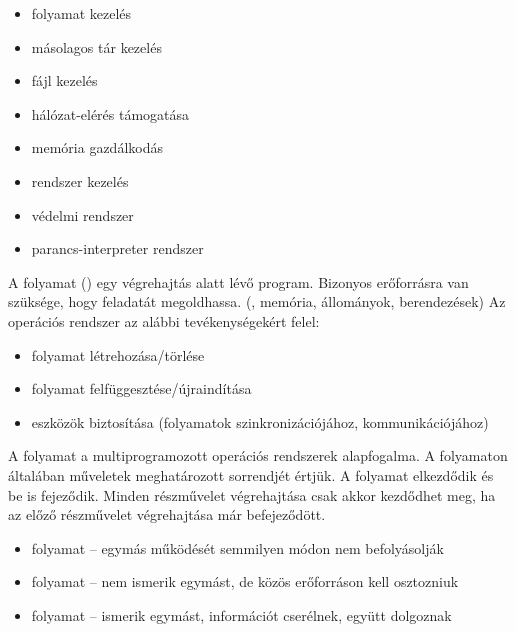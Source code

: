 \documentclass[main.tex]{subfiles}
\begin{document}
  \begin{minipage}[t]{0.5\textwidth}
    \begin{itemize}
      \item folyamat kezelés
      \item másolagos tár kezelés
      \item fájl kezelés
      \item hálózat-elérés támogatása
    \end{itemize}
  \end{minipage}\hfill
  \begin{minipage}[t]{0.5\textwidth}
    \begin{itemize}
      \item memória gazdálkodás
      \item {} rendszer kezelés
      \item védelmi rendszer
      \item parancs-interpreter rendszer
    \end{itemize}
  \end{minipage}\hfill
  


  A folyamat () egy végrehajtás alatt lévő program.
  Bizonyos erőforrásra van szüksége, hogy feladatát megoldhassa.
  (, memória, állományok,  berendezések)
  Az operációs rendszer az alábbi tevékenységekért felel:
  \begin{itemize}
    \item folyamat létrehozása/törlése
    \item folyamat felfüggesztése/újraindítása
    \item eszközök biztosítása
    (folyamatok szinkronizációjához, kommunikációjához)
  \end{itemize}
  A folyamat a multiprogramozott operációs rendszerek alapfogalma.
  A folyamaton általában műveletek meghatározott sorrendjét értjük.
  A folyamat elkezdődik és be is fejeződik.
  Minden részművelet végrehajtása csak akkor kezdődhet meg,
  ha az előző részművelet végrehajtása már befejeződött.
  \begin{itemize}
    \item {} folyamat
    \tabto{4.6cm} – \tabto{5.2cm}
    egymás működését semmilyen módon nem befolyásolják

    \item {} folyamat
    \tabto{4.6cm} – \tabto{5.2cm}
    nem ismerik egymást, de közös erőforráson kell osztozniuk

    \item {} folyamat
    \tabto{4.6cm} – \tabto{5.2cm}
    ismerik egymást, információt cserélnek, együtt dolgoznak
  \end{itemize}
\end{document}
